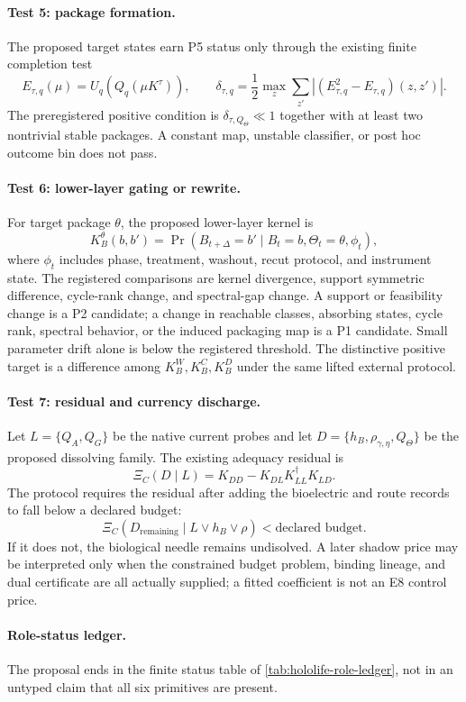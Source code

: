 \paragraph{Test 5: package formation.}
The proposed target states earn P5 status only through the existing finite
completion test
\[
E_{\tau,q}(\mu)=U_q\!\left(Q_q(\mu K^\tau)\right),
\qquad
\delta_{\tau,q}
=\frac12\max_z\sum_{z'}
\left|(E_{\tau,q}^2-E_{\tau,q})(z,z')\right|.
\]
The preregistered positive condition is
$\delta_{\tau,Q_\Theta}\ll1$ together with at least two nontrivial stable
packages.  A constant map, unstable classifier, or post hoc outcome bin does
not pass.

\paragraph{Test 6: lower-layer gating or rewrite.}
For target package $\theta$, the proposed lower-layer kernel is
\[
K_B^\theta(b,b')=
\Pr(B_{t+\Delta}=b'\mid B_t=b,\Theta_t=\theta,\phi_t),
\]
where $\phi_t$ includes phase, treatment, washout, recut protocol, and
instrument state.  The registered comparisons are kernel divergence,
support symmetric difference, cycle-rank change, and spectral-gap change.
A support or feasibility change is a P2 candidate; a change in reachable
classes, absorbing states, cycle rank, spectral behavior, or the induced
packaging map is a P1 candidate.  Small parameter drift alone is below the
registered threshold.  The distinctive positive target is a difference
among $K_B^W,K_B^C,K_B^D$ under the same lifted external protocol.

\paragraph{Test 7: residual and currency discharge.}
Let $L=\{Q_A,Q_G\}$ be the native current probes and let
$D=\{h_B,\rho_{\gamma,\eta},Q_\Theta\}$ be the proposed dissolving family.
The existing adequacy residual is
\[
\Xi_C(D\mid L)
=K_{DD}-K_{DL}K_{LL}^{\dagger}K_{LD}.
\]
The protocol requires the residual after adding the bioelectric and route
records to fall below a declared budget:
\[
\Xi_C(D_{\mathrm{remaining}}\mid L\vee h_B\vee\rho)
<\text{declared budget}.
\]
If it does not, the biological needle remains undisolved.  A later shadow
price may be interpreted only when the constrained budget problem, binding
lineage, and dual certificate are all actually supplied; a fitted
coefficient is not an E8 control price.

\paragraph{Role-status ledger.}
The proposal ends in the finite status table of
\cref{tab:hololife-role-ledger}, not in an untyped claim that all six
primitives are present.

